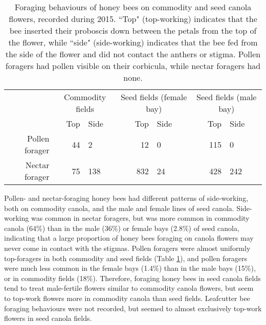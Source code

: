 \begin{table}
\begin{tabular}{r|r|l|r|l|r|l}
               & \multicolumn{2}{c|}{Commodity fields} & \multicolumn{2}{c|}{Seed fields (female bay)} & \multicolumn{2}{c}{Seed fields (male bay)} \\ \cline{2-7}
               & Top & Side & Top & Side & Top & Side           \\ \hline
Pollen forager & 44 & 2 & 12 & 0 & 115 & 0 \\
Nectar forager & 75 & 138 & 832 & 24 & 428 & 242 \\
\end{tabular}
\caption[Foraging behaviours of honey bees on commodity and seed canola flowers]{Foraging behaviours of honey bees on commodity and seed canola flowers, recorded during 2015. ``Top" (top-working) indicates that the bee inserted their proboscis down between the petals from the top of the flower, while ``side" (side-working) indicates that the bee fed from the side of the flower and did not contact the anthers or stigma. Pollen foragers had pollen visible on their corbicula, while nectar foragers had none.}
\label{tab:sideWorking}
\end{table}


Pollen- and nectar-foraging honey bees had different patterns of side-working, both on commodity canola, and the male and female lines of seed canola.
Side-working was common in nectar foragers, but was more common in commodity canola (64\%) than in the male (36\%) or female bays (2.8\%) of seed canola, indicating that a large proportion of honey bees foraging on canola flowers may never come in contact with the stigmas.
Pollen foragers were almost uniformly top-foragers in both commodity and seed fields (Table \ref{tab:sideWorking}), and pollen foragers were much less common in the female bays (1.4\%) than in the male bays (15\%), or in commodity fields (18\%).
Therefore, foraging honey bees in seed canola fields tend to treat male-fertile flowers similar to commodity canola flowers, but seem to top-work flowers more in commodity canola than seed fields.
Leafcutter bee foraging behaviours were not recorded, but seemed to almost exclusively top-work flowers in seed canola fields.
